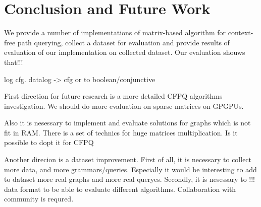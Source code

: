\section{Conclusion and Future Work}

We provide a number of implementations of matrix-based algorithm for context-free path querying, collect a dataset for evaluation and provide results of evaluation of our implementation on collected dataset.
Our evaluation shouws that!!!

log cfg. datalog -> cfg or to boolean/conjunctive

First direction for future research is a more detailed CFPQ algorithms investigation.
We should do more evaluation on sparse matrices on GPGPUs.

Also it is nesessary to implement and evaluate solutions for graphs which is not fit in RAM.
There is a set of technics for huge matrices multiplication.
Is it possible to dopt it for CFPQ

Another direcion is a dataset improvement.
First of all, it is necessary to collect more data, and more grammars/queries.
Especially it would be interesting to add to dataset more real graphs and more real queryes.
Secondly, it is nesessary to !!! data format to be able to evaluate different algorithms.
Collaboration with community is requred.

